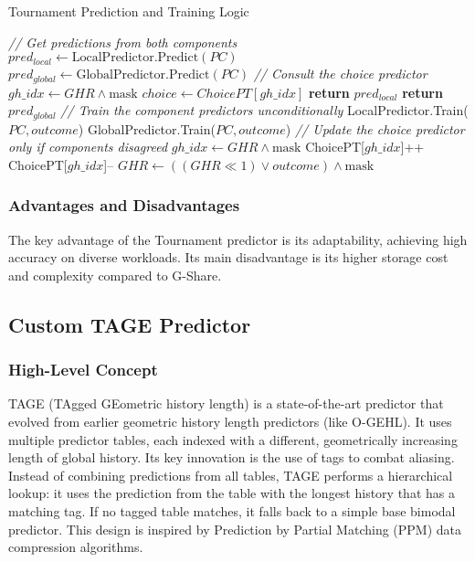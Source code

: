 \documentclass[sigconf, screen]{acmart}
\begin{document}
\begin{algorithm}[H]
\caption{Tournament Prediction and Training Logic}
\label{alg:tournament}
\begin{algorithmic}[1]
    \State \textit{// Get predictions from both components}
    \State $pred_{local} \gets \text{LocalPredictor.Predict}(PC)$
    \State $pred_{global} \gets \text{GlobalPredictor.Predict}(PC)$
    \Statex
    \State \textit{// Consult the choice predictor}
    \State $gh\_idx \gets GHR \land \text{mask}$
    \State $choice \gets ChoicePT[gh\_idx]$
     
        \State \textbf{return} $pred_{local}$
    \Else {}
        \State \textbf{return} $pred_{global}$
    \EndIf
\EndProcedure
\Statex
{}
    \State \textit{// Train the component predictors unconditionally}
    \State LocalPredictor.Train($PC, outcome$)
    \State GlobalPredictor.Train($PC, outcome$)
    \Statex
    \State \textit{// Update the choice predictor only if components disagreed}
        \State $gh\_idx \gets GHR \land \text{mask}$
         
             \State ChoicePT[$gh\_idx$]++ 
         
             \State ChoicePT[$gh\_idx$]-- 
        \EndIf
    \EndIf
    \State $GHR \gets ((GHR \ll 1) \lor outcome) \land \text{mask}$
\EndProcedure
\end{algorithmic}
\end{algorithm}

\subsubsection{Advantages and Disadvantages}
The key advantage of the Tournament predictor is its adaptability, achieving high accuracy on diverse workloads. Its main disadvantage is its higher storage cost and complexity compared to G-Share.

\subsection{Custom TAGE Predictor}

\subsubsection{High-Level Concept}
TAGE (TAgged GEometric history length) \cite{seznec2006cottage} is a state-of-the-art predictor that evolved from earlier geometric history length predictors (like O-GEHL). It uses multiple predictor tables, each indexed with a different, geometrically increasing length of global history. Its key innovation is the use of tags to combat aliasing. Instead of combining predictions from all tables, TAGE performs a hierarchical lookup: it uses the prediction from the table with the longest history that has a matching tag. If no tagged table matches, it falls back to a simple base bimodal predictor. This design is inspired by Prediction by Partial Matching (PPM) data compression algorithms.
\end{document}
